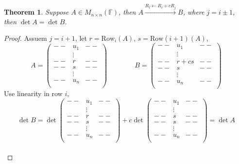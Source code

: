 \documentclass[12pt]{article}
\newtheorem{theorem}{Theorem}[subsection]
\newcommand{\Row}{\mathrm{Row}}
\newcommand{\mF}{{\mathbb{F}}}
\begin{document}
\begin{theorem}
	Suppose $A \in M_{n\times n} (\mF)$, then $A \overset{R_i \leftarrow R_i + 
	cR_j}{\longrightarrow} B$, where $j = i \pm 1$, then $\det A = \det B$. 
\end{theorem}
\begin{proof}
	Assuem $j = i +1$, let $r = \Row_i(A)$, $s = \Row(i+1)(A)$, 
	\[
		A = 
		\begin{pmatrix}
			--	& u_1 &	--	\\
				& \vdots &	\\
			--	& r &	--	\\
			--	& s &	--	\\ 
				& \vdots &	\\
			--	& u_n &	--	\\
		\end{pmatrix}
	\qquad \qquad 
		B=\begin{pmatrix}
			--	& u_1 &	--	\\
				& \vdots &	\\
			--	& r+cs &	--	\\
			--	& s &	--	\\ 
				& \vdots &	\\
			--	& u_n &	--	\\
		\end{pmatrix}
	\]
	Use linearity in row $i$, 
	\[
		\det B = \det \begin{pmatrix}
			--	& u_1 &	--	\\
				& \vdots &	\\
			--	& r &	--	\\
			--	& s &	--	\\ 
				& \vdots &	\\
			--	& u_n &	--	\\
		\end{pmatrix}
		+ c\det \begin{pmatrix}
			--	& u_1 &	--	\\
				& \vdots &	\\
			--	& s &	--	\\
			--	& s &	--	\\ 
				& \vdots &	\\
			--	& u_n &	--	\\
		\end{pmatrix}
		= \det A
	\]	\\
\end{proof}
\end{document}
